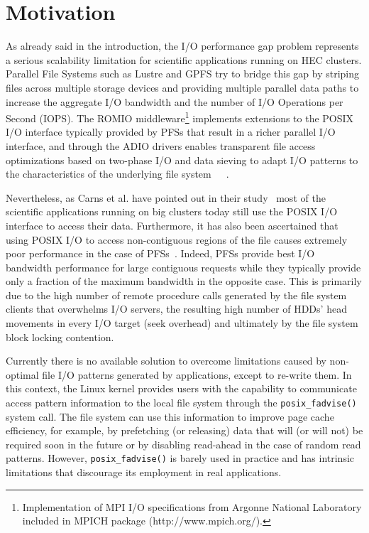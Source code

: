 \section{Motivation}
\label{sec: motivation}

As already said in the introduction, the I/O performance gap problem represents a serious scalability limitation for scientific applications running on HEC clusters. Parallel File Systems such as Lustre and GPFS try to bridge this gap by striping files across multiple storage devices and providing multiple parallel data paths to increase the aggregate I/O bandwidth and the number of I/O Operations per Second (IOPS). The ROMIO middleware\footnote{Implementation of MPI I/O specifications from Argonne National Laboratory included in MPICH package (http://www.mpich.org/).} implements extensions to the POSIX I/O interface typically provided by PFSs that result in a richer parallel I/O interface, and through the ADIO drivers enables transparent file access optimizations based on two-phase I/O and data sieving to adapt I/O patterns to the characteristics of the underlying file system~\cite{ThakurGL99}~\cite{Ying08}~\cite{ProstTHKW00}.

Nevertheless, as Carns et al. have pointed out in their study~\cite{CarnsHABLLR11} most of the scientific applications running on big clusters today still use the POSIX I/O interface to access their data. Furthermore, it has also been ascertained that using POSIX I/O to access non-contiguous regions of the file causes extremely poor performance in the case of PFSs~\cite{ChingCLP06}. Indeed, PFSs provide best I/O bandwidth performance for large contiguous requests while they typically provide only a fraction of the maximum bandwidth in the opposite case. This is primarily due to the high number of remote procedure calls generated by the file system clients that overwhelms I/O servers, the resulting high number of HDDs' head movements in every I/O target (seek overhead) and ultimately by the file system block locking contention.

Currently there is no available solution to overcome limitations caused by non-optimal file I/O patterns generated by applications, except to re-write them. In this context, the Linux kernel provides users with the capability to communicate access pattern information to the local file system through the \texttt{posix\_fadvise()}~\cite{AdviseAPI} system call. The file system can use this information to improve page cache efficiency, for example, by prefetching (or releasing) data that will (or will not) be required soon in the future or by disabling read-ahead in the case of random read patterns. However, \texttt{posix\_fadvise()} is barely used in practice and has intrinsic limitations that discourage its employment in real applications.

